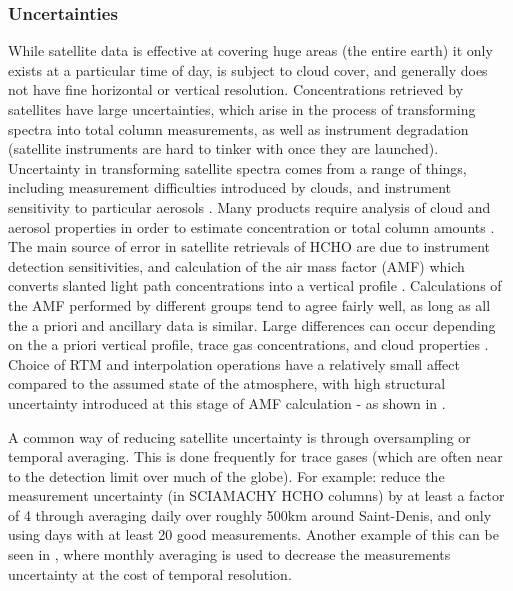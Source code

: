   
    \subsubsection{Uncertainties}
      
      While satellite data is effective at covering huge areas (the entire earth) it only exists at a particular time of day, is subject to cloud cover, and generally does not have fine horizontal or vertical resolution.
      Concentrations retrieved by satellites have large uncertainties, which arise in the process of transforming spectra into total column measurements, as well as instrument degradation (satellite instruments are hard to tinker with once they are launched).
      Uncertainty in transforming satellite spectra comes from a range of things, including measurement difficulties introduced by clouds, and instrument sensitivity to particular aerosols \parencite{Millet2006}.
      Many products require analysis of cloud and aerosol properties in order to estimate concentration or total column amounts \parencite{Palmer2001,Palmer2003, Marais2012, Vasilkov2017}.
      The main source of error in satellite retrievals of HCHO are due to instrument detection sensitivities, and calculation of the air mass factor (AMF) which converts slanted light path concentrations into a vertical profile \parencite{Millet2006}.
      Calculations of the AMF performed by different groups tend to agree fairly well, as long as all the a priori and ancillary data is similar.
      Large differences can occur depending on the a priori vertical profile, trace gas concentrations, and cloud properties \parencite{Lorente2017}.
      Choice of RTM and interpolation operations have a relatively small affect compared to the assumed state of the atmosphere, with high structural uncertainty introduced at this stage of AMF calculation - as shown in \textcite{Lorente2017}.
      
      A common way of reducing satellite uncertainty is through oversampling or temporal averaging.
      This is done frequently for trace gases (which are often near to the detection limit over much of the globe).
      For example: \textcite{Vigouroux2009} reduce the measurement uncertainty (in SCIAMACHY HCHO columns) by at least a factor of 4 through averaging daily over roughly 500km around Saint-Denis, and only using days with at least 20 good measurements.
      Another example of this can be seen in \textcite{Dufour2009}, where monthly averaging is used to decrease the measurements uncertainty at the cost of temporal resolution.
      

